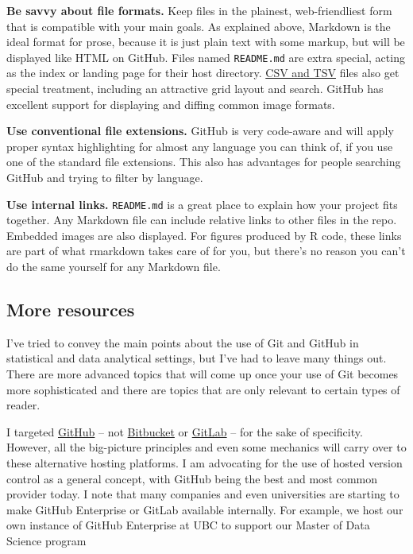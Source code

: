 \documentclass[12pt]{article}
\begin{document}
\textbf{Be savvy about file formats.} Keep files in the plainest,
web-friendliest form that is compatible with your main goals. As
explained above, Markdown is the ideal format for prose, because it is
just plain text with some markup, but will be displayed like HTML on
GitHub. Files named \texttt{README.md} are extra special, acting as the
index or landing page for their host directory.
\href{https://help.github.com/articles/rendering-csv-and-tsv-data/}{CSV
and TSV} files also get special treatment, including an attractive grid
layout and search. GitHub has excellent support for displaying and
diffing common image formats.

\textbf{Use conventional file extensions.} GitHub is very code-aware and
will apply proper syntax highlighting for almost any language you can
think of, if you use one of the standard file extensions. This also has
advantages for people searching GitHub and trying to filter by language.

\textbf{Use internal links.} \texttt{README.md} is a great place to
explain how your project fits together. Any Markdown file can include
relative links to other files in the repo. Embedded images are also
displayed. For figures produced by R code, these links are part of what
rmarkdown takes care of for you, but there's no reason you can't do the
same yourself for any Markdown file.

\subsection{More resources}\label{more-resources}

I've tried to convey the main points about the use of Git and GitHub in
statistical and data analytical settings, but I've had to leave many
things out. There are more advanced topics that will come up once your
use of Git becomes more sophisticated and there are topics that are only
relevant to certain types of reader.

I targeted \href{https://github.com}{GitHub} -- not
\href{https://bitbucket.org}{Bitbucket} or
\href{https://about.gitlab.com}{GitLab} -- for the sake of specificity.
However, all the big-picture principles and even some mechanics will
carry over to these alternative hosting platforms. I am advocating for
the use of hosted version control as a general concept, with GitHub
being the best and most common provider today. I note that many
companies and even universities are starting to make GitHub Enterprise
or GitLab available internally. For example, we host our own instance of
GitHub Enterprise at UBC to support our Master of Data Science program
\end{document}

